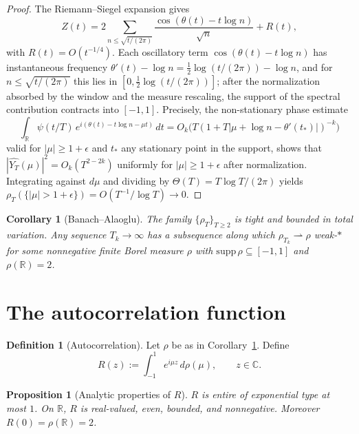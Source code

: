 \documentclass[11pt]{article}
\newtheorem{proposition}[theorem]{Proposition}
\newtheorem{corollary}[theorem]{Corollary}
\theoremstyle{definition}
\newtheorem{definition}[theorem]{Definition}
\theoremstyle{remark}
\begin{document}
\begin{proof}
The Riemann--Siegel expansion gives
\[
Z(t) = 2 \sum_{n \leq \sqrt{t/(2\pi)}} \frac{\cos(\theta(t) - t \log n)}{\sqrt n} + R(t),
\]
with $R(t) = O(t^{-1/4})$. Each oscillatory term $\cos(\theta(t) - t \log n)$ has instantaneous frequency $\theta'(t) - \log n = \tfrac12 \log(t/(2\pi)) - \log n$, and for $n \leq \sqrt{t/(2\pi)}$ this lies in $[0, \tfrac12 \log(t/(2\pi))]$; after the normalization absorbed by the window and the measure rescaling, the support of the spectral contribution contracts into $[-1,1]$. Precisely, the non-stationary phase estimate
\[
\int_{\mathbb R} \psi(t/T)\, e^{i(\theta(t) - t \log n - \mu t)}\, dt = O_k\!\big( T (1 + T |\mu + \log n - \theta'(t_*)|)^{-k}\big)
\]
valid for $|\mu| \geq 1 + \epsilon$ and $t_*$ any stationary point in the support, shows that $|\widehat{Y_T}(\mu)|^2 = O_k(T^{2-2k})$ uniformly for $|\mu| \geq 1+\epsilon$ after normalization. Integrating against $d\mu$ and dividing by $\Theta(T) = T \log T /(2\pi)$ yields $\rho_T(\{|\mu| > 1+\epsilon\}) = O(T^{-1}/\log T) \to 0$.
\end{proof}

\begin{corollary}[Banach--Alaoglu]\label{cor:BA}
The family $\{\rho_T\}_{T \geq 2}$ is tight and bounded in total variation. Any sequence $T_k \to \infty$ has a subsequence along which $\rho_{T_k} \rightharpoonup \rho$ weak-$*$ for some nonnegative finite Borel measure $\rho$ with $\mathrm{supp}\,\rho \subseteq [-1,1]$ and $\rho(\mathbb R) = 2$.
\end{corollary}

\section{The autocorrelation function}

\begin{definition}[Autocorrelation]
Let $\rho$ be as in Corollary~\ref{cor:BA}. Define
\[
R(z) := \int_{-1}^{1} e^{i\mu z}\, d\rho(\mu), \qquad z \in \mathbb C.
\]
\end{definition}

\begin{proposition}[Analytic properties of $R$]\label{prop:R}
$R$ is entire of exponential type at most $1$. On $\mathbb R$, $R$ is real-valued, even, bounded, and nonnegative. Moreover $R(0) = \rho(\mathbb R) = 2$.
\end{proposition}
\end{document}
